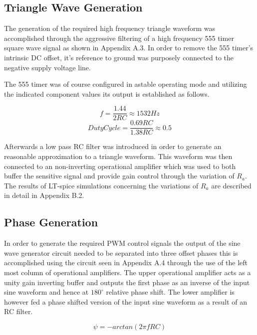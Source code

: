 \documentclass[12pt]{article}
\begin{document}
\subsection{Triangle Wave Generation}%

The generation of the required high frequency triangle waveform was accomplished through the aggressive filtering of a high frequency 555 timer square wave signal as shown in Appendix A.3. In order to remove the 555 timer's intrinsic DC offset, it's reference to ground was purposely connected to the negative supply voltage line. 

The 555 timer was of course configured in astable operating mode and utilizing the indicated component values its output is established as follows.

\begin{equation}
    f=\frac{1.44}{2RC}\approx 1532Hz
\end{equation}
\begin{equation}
    DutyCycle=\frac{0.69RC}{1.38RC}\approx 0.5
\end{equation}

Afterwards a low pass RC filter was introduced in order to generate an reasonable approximation to a triangle waveform. This waveform was then connected to an non-inverting operational amplifier which was used to both buffer the sensitive signal and provide gain control through the variation of $R_a$. The results of LT-spice simulations concerning the variations of $R_a$ are described in detail in Appendix B.2.

\subsection{Phase Generation}%

In order to generate the required PWM control signals the output of the sine wave generator circuit needed to be separated into three offset phases this is accomplished using the circuit seen in Appendix A.4 through the use of the left most column of operational amplifiers. The upper operational amplifier acts as a unity gain inverting buffer and outputs the first phase as an inverse of the input sine waveform and hence at $180^{\circ}$ relative phase shift. The lower amplifier is however fed a phase shifted version of the input sine waveform as a result of an RC filter.

\begin{equation}
    \psi=-arctan(2\pi fRC)
\end{equation}
\end{document}
